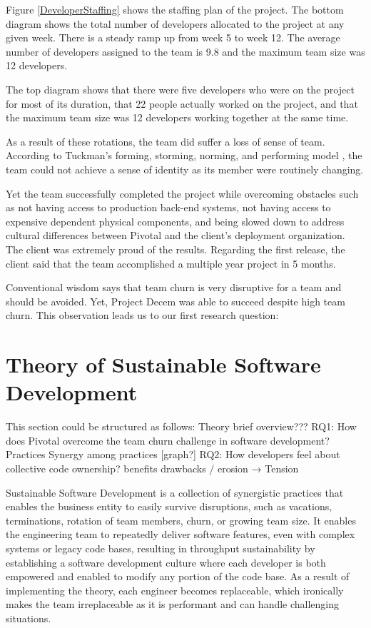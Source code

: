 Figure \ref{DeveloperStaffing} shows the staffing plan of the project. The bottom diagram shows the total number of developers allocated to the project at any given week. There is a steady ramp up from week 5 to week 12. The average number of developers assigned to the team is 9.8 and the maximum team size was 12 developers.

The top diagram shows that there were five developers who were on the project for most of its duration, that 22 people actually worked on the project, and that the maximum team size was 12 developers working together at the same time.

As a result of these rotations, the team did suffer a loss of sense of team. According to Tuckman's forming, storming, norming, and performing model \cite{TuckmanModel}, the team could not achieve a sense of identity as its member were routinely changing. 

Yet the team successfully completed the project while overcoming obstacles such as not having access to production back-end systems, not having access to expensive dependent physical components, and being slowed down to address cultural differences between Pivotal and the client's deployment organization. The client was extremely proud of the results. Regarding the first release, the client said that the team accomplished a multiple year project in 5 months. 

Conventional wisdom says that team churn is very disruptive for a team and should be avoided. Yet, Project Decem was able to succeed despite high team churn. This observation leads us to our first research question: 

\section{Theory of Sustainable Software Development}
\label{Theory}
This section could be structured as follows:
Theory brief overview???
RQ1: How does Pivotal overcome the team churn challenge in software development?
Practices
Synergy among practices [graph?]
RQ2: How developers feel about collective code ownership?
benefits
drawbacks / erosion
→ Tension

Sustainable Software Development is a collection of synergistic practices that enables the business entity to easily survive disruptions, such as vacations, terminations, rotation of team members, churn, or growing team size. It enables the engineering team to repeatedly deliver software features, even with complex systems or legacy code bases, resulting in throughput sustainability by establishing a software development culture where each developer is both empowered and enabled to modify any portion of the code base. As a result of implementing the theory, each engineer becomes replaceable, which ironically makes the team irreplaceable as it is performant and can handle challenging situations. 


